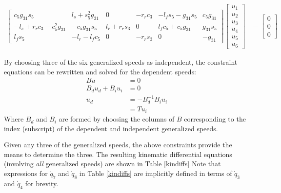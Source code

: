 \documentclass[letterpaper,11pt]{article}
\begin{document}
\begin{align*}
  \left[
  \begin{array}{cccccc}
    c_5 g_{31} s_5 & l_s + s_5^2 g_{31} & 0 & -r_r c_3 & -l_f s_5 - g_{31} s_5
    & c_5 g_{31} \\
    -l_s + r_r c_3 - c_5^2 g_{31} & -c_5 g_{31} s_5 & l_r + r_r s_3 & 0 & l_f
    c_5 + c_5 g_{31} & g_{31} s_5 \\
    l_f s_5 & -l_r - l_f c_5 & 0 & -r_r s_3 & 0 & -g_{31}
  \end{array}
  \right]
  \left[
    \begin{array}{c}
      u_1 \\ u_2 \\ u_3 \\ u_4 \\ u_5 \\ u_6
    \end{array}
    \right]
  & =
  \left[
    \begin{array}{c}
      0 \\ 0 \\ 0
    \end{array}
    \right]
\end{align*}

By choosing three of the six generalized speeds as independent, the constraint
equations can be rewritten and solved for the dependent speeds:
\begin{align*}
  B u & = 0 \\
  B_d u_d + B_i u_i & = 0 \\
  u_d & = -B_d^{-1} B_i u_i \\
      & = T u_i
\end{align*}
Where $B_d$ and $B_i$ are formed by choosing the columns of $B$ corresponding
to the index (subscript) of the dependent and independent generalized speeds.

Given any three of the generalized speeds, the above constraints provide the
means to determine the three.  The resulting kinematic differential equations
(involving {\it{all}} generalized speeds) are shown in Table \ref{kindiffs}
Note that expressions for $\dot{q}_7$ and $\dot{q}_8$ in Table \ref{kindiffs}
are implicitly defined in terms of $\dot{q}_3$ and $\dot{q}_4$ for brevity.
\end{document}
